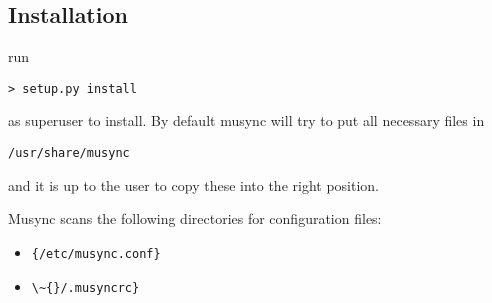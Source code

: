 \subsection{Installation}

run
\begin{verbatim}
> setup.py install
\end{verbatim}

as superuser to install. By default musync will try to put all necessary files in
\begin{verbatim}
/usr/share/musync
\end{verbatim}
and it is up to the user to copy these into the right position.

Musync scans the following directories for configuration files:
\begin{itemize}
\item \verb!{/etc/musync.conf}!
\item \verb!\~{}/.musyncrc}!
\end{itemize}
